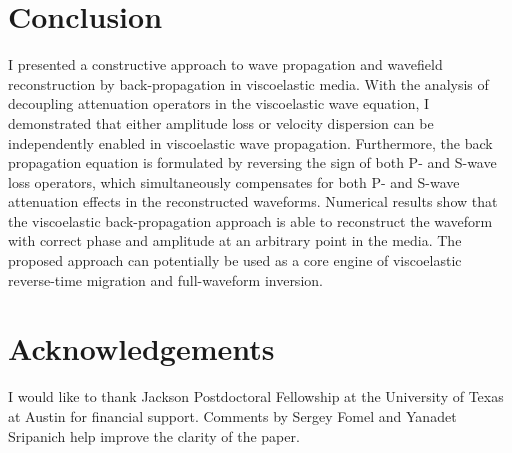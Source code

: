 
\section{Conclusion}
I presented a constructive approach to wave propagation and wavefield reconstruction by back-propagation in viscoelastic media. With the analysis of decoupling attenuation operators in the viscoelastic wave equation, I demonstrated that either amplitude loss or velocity dispersion can be independently enabled in viscoelastic wave propagation. Furthermore, the back propagation equation is formulated by reversing the sign of both P- and S-wave loss operators, which simultaneously compensates for both P- and S-wave attenuation effects in the reconstructed waveforms. Numerical results show that the viscoelastic back-propagation approach is able to reconstruct the waveform with correct phase and amplitude at an arbitrary point in the media. The proposed approach can potentially be used as a core engine of viscoelastic reverse-time migration and full-waveform inversion.

\section{Acknowledgements}
I would like to thank Jackson Postdoctoral Fellowship at the University of Texas at Austin for financial support. Comments by Sergey Fomel and Yanadet Sripanich help improve the clarity of the paper.


\onecolumn




